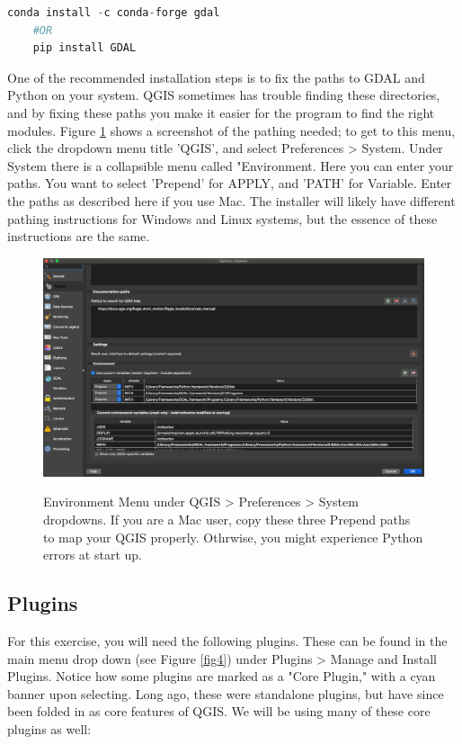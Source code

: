 \documentclass{article}
\begin{document}
\begin{lstlisting}[language=Python]
    conda install -c conda-forge gdal 
    #OR
    pip install GDAL
\end{lstlisting}

One of the recommended installation steps is to fix the paths to GDAL and Python on your system. QGIS sometimes has trouble finding these directories, and by fixing these paths you make it easier for the program to find the right modules. Figure \ref{fig:fig3} shows a screenshot of the pathing needed; to get to this menu, click the dropdown menu title 'QGIS', and select Preferences > System. Under System there is a collapsible menu called "Environment. Here you can enter your paths. You want to select 'Prepend' for APPLY, and 'PATH' for Variable. Enter the paths as described here if you use Mac. The installer will likely have different pathing instructions for Windows and Linux systems, but the essence of these instructions are the same. 

\begin{figure}[htbp]
    \centering
    \includegraphics[width=\textwidth]{Figure3_Environment_Paths.png}
    \label{fig:fig3}
    \caption{Environment Menu under QGIS > Preferences > System dropdowns. If you are a Mac user, copy these three Prepend paths to map your QGIS properly. Othrwise, you might experience Python errors at start up.}
\end{figure}

\subsection{Plugins}

For this exercise, you will need the following plugins. These can be found in the main menu drop down (see Figure \ref{fig4}) under Plugins > Manage and Install Plugins. Notice how some plugins are marked as a "Core Plugin," with a cyan banner upon selecting. Long ago, these were standalone plugins, but have since been folded in as core features of QGIS. We will be using many of these core plugins as well:
\end{document}
